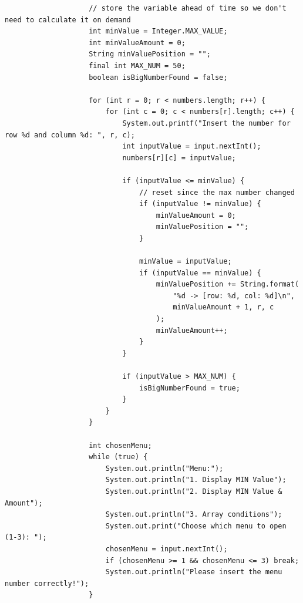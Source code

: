 \documentclass[12pt,titlepage]{article}
\begin{document}
\begin{enumerate}
{\begin{verbatim}
                    // store the variable ahead of time so we don't need to calculate it on demand
                    int minValue = Integer.MAX_VALUE;
                    int minValueAmount = 0;
                    String minValuePosition = "";
                    final int MAX_NUM = 50;
                    boolean isBigNumberFound = false;

                    for (int r = 0; r < numbers.length; r++) {
                        for (int c = 0; c < numbers[r].length; c++) {
                            System.out.printf("Insert the number for row %d and column %d: ", r, c);
                            int inputValue = input.nextInt();
                            numbers[r][c] = inputValue;

                            if (inputValue <= minValue) {
                                // reset since the max number changed
                                if (inputValue != minValue) {
                                    minValueAmount = 0;
                                    minValuePosition = "";
                                }

                                minValue = inputValue;
                                if (inputValue == minValue) {
                                    minValuePosition += String.format(
                                        "%d -> [row: %d, col: %d]\n",
                                        minValueAmount + 1, r, c
                                    );
                                    minValueAmount++;
                                }
                            }

                            if (inputValue > MAX_NUM) {
                                isBigNumberFound = true;
                            }
                        }
                    }

                    int chosenMenu;
                    while (true) {
                        System.out.println("Menu:");
                        System.out.println("1. Display MIN Value");
                        System.out.println("2. Display MIN Value & Amount");
                        System.out.println("3. Array conditions");
                        System.out.print("Choose which menu to open (1-3): ");
                        chosenMenu = input.nextInt();
                        if (chosenMenu >= 1 && chosenMenu <= 3) break;
                        System.out.println("Please insert the menu number correctly!");
                    }


\end{verbatim}}
\end{enumerate}
\end{document}
